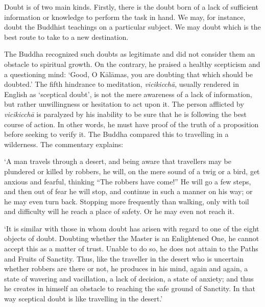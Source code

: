 
Doubt is of two main kinds. Firstly, there is the doubt born of a lack
of sufficient information or knowledge to perform the task in hand. We
may, for instance, doubt the Buddhist teachings on a particular subject.
We may doubt which is the best route to take to a new destination.

The Buddha recognized such doubts as legitimate and did not consider them an
obstacle to spiritual growth. On the contrary, he praised a healthy
scepticism and a questioning mind: `Good, O Kālāmas, you are doubting
that which should be doubted.' The fifth hindrance to meditation, 
\emph{vicikicchā}, usually rendered in English as `sceptical doubt', is
not the mere awareness of a lack of information, but rather
unwillingness or hesitation to act upon it. The person afflicted by
\emph{vicikicchā} is paralyzed by his inability to be sure that he is
following the best course of action. In other words, he must have proof
of the truth of a proposition before seeking to verify it. The Buddha
compared this to travelling in a wilderness. The commentary explains: 

`A man travels through a desert, and being aware that travellers may be
plundered or killed by robbers, he will, on the mere sound of a twig or
a bird, get anxious and fearful, thinking ``The robbers have come!'' He
will go a few steps, and then out of fear he will stop, and continue in
such a manner on his way; or he may even turn back. Stopping more
frequently than walking, only with toil and difficulty will he reach a
place of safety. Or he may even not reach it. 

`It is similar with those in whom doubt has arisen with regard to one of
the eight objects of doubt. Doubting whether the Master is an
Enlightened One, he cannot accept this as a matter of trust. Unable to
do so, he does not attain to the Paths and Fruits of Sanctity. Thus, 
like the traveller in the desert who is uncertain whether robbers are
there or not, he produces in his mind, again and again, a state of
wavering and vacillation, a lack of decision, a state of anxiety; and
thus he creates in himself an obstacle to reaching the safe ground of
Sanctity. In that way sceptical doubt is like travelling in the desert.'

